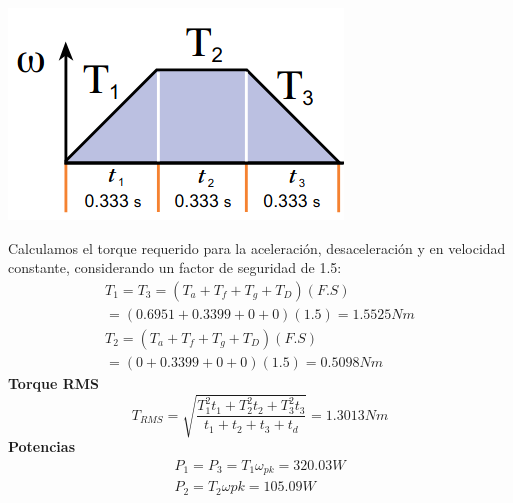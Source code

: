 \begin{center}
    \includegraphics[scale=0.55]{imagenes/perfil torque.png}
    \label{fig:perfil_torq}
\end{center}
Calculamos el torque requerido para la aceleración, desaceleración y en velocidad constante, considerando un factor de seguridad de 1.5:
\begin{align}
    T_1 = T_3 = (T_a+T_f+T_g+T_D)(F.S)\\
    = (0.6951+0.3399+0+0)(1.5) = 1.5525Nm \\
    T_2 = (T_a+T_f+T_g+T_D)(F.S) \\
    = (0+0.3399+0+0)(1.5)=0.5098Nm
\end{align}
\textbf{Torque RMS}
\begin{equation}
    T_{RMS}=\sqrt{\frac{T_1^2t_1+T_2^2t_2+T_3^2t_3}{t_1+t_2+t_3+t_d}} = 1.3013Nm
\end{equation}
\textbf{Potencias}
\begin{align}
    P_1 = P_3 = T_1\omega_{pk} = 320.03W \\
    P_2 = T_2\omega{pk}=105.09W
\end{align}

